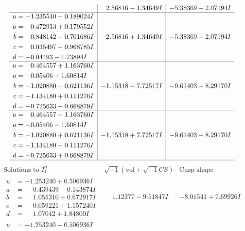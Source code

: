 \documentclass[1p]{elsarticle_modified}
\theoremstyle{definition}
\newcommand{\I}{\sqrt{-1}}
\begin{document}
$$\begin{array}{c|c|c}
 & \phantom{-}2.56816 - 1.34649 I & -5.38369 + 2.07194 I \\ \hline\begin{aligned}
u &= -1.235540 - 0.189024 I \\
a &= \phantom{-}0.472913 + 0.179552 I \\
b &= \phantom{-}0.848142 - 0.701686 I \\
c &= \phantom{-}0.035497 - 0.968785 I \\
d &= -0.04493 - 1.73894 I\end{aligned}
 & \phantom{-}2.56816 + 1.34649 I & -5.38369 - 2.07194 I \\ \hline\begin{aligned}
u &= \phantom{-}0.464557 + 1.163760 I \\
a &= -0.05406 + 1.60814 I \\
b &= -1.020880 - 0.621136 I \\
c &= -1.134180 + 0.111276 I \\
d &= -0.725633 - 0.668879 I\end{aligned}
 & -1.15318 - 7.72517 I & -9.61403 + 8.29170 I \\ \hline\begin{aligned}
u &= \phantom{-}0.464557 - 1.163760 I \\
a &= -0.05406 - 1.60814 I \\
b &= -1.020880 + 0.621136 I \\
c &= -1.134180 - 0.111276 I \\
d &= -0.725633 + 0.668879 I\end{aligned}
 & -1.15318 + 7.72517 I & -9.61403 - 8.29170 I\\
 \hline 
 \end{array}$$\newpage$$\begin{array}{c|c|c}  
\text{Solutions to }I^u_{1}& \I (\text{vol} + \sqrt{-1}CS) & \text{Cusp shape}\\
 \hline 
\begin{aligned}
u &= -1.253240 + 0.506936 I \\
a &= \phantom{-}0.439439 - 0.143874 I \\
b &= \phantom{-}1.055310 + 0.672917 I \\
c &= \phantom{-}0.059221 + 1.157240 I \\
d &= \phantom{-}1.07042 + 1.84800 I\end{aligned}
 & \phantom{-}1.12377 - 9.51847 I & -8.01541 + 7.69926 I \\ \hline\begin{aligned}
u &= -1.253240 - 0.506936 I \\

\end{aligned}
\end{array}$$
\end{document}
